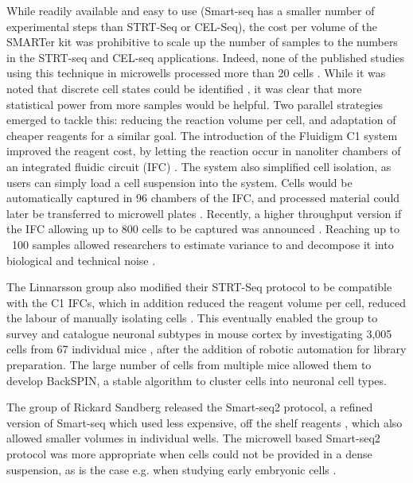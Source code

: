 While readily available and easy to use (Smart-seq has a smaller number of experimental
steps than STRT-Seq or CEL-Seq), the cost per volume of the SMARTer kit was prohibitive
to scale up the number of samples to the numbers in the STRT-seq and CEL-seq
applications. Indeed, none of the published studies using this technique in microwells
processed more than 20 cells \cite{Ramskold2012-zc, Marinov2014-bf, Shalek2013-lw}. While it was noted that discrete cell states could be identified \cite{Shalek2013-lw}, it was clear that more statistical power from more samples would be helpful. Two parallel strategies emerged to tackle this: reducing the reaction volume per cell, and adaptation of cheaper reagents for a similar goal. The introduction of the Fluidigm C1 system improved the reagent cost, by letting the reaction occur in nanoliter chambers of an integrated fluidic circuit (IFC) \cite{Fluidigm_Corporation2013-vw}. The system also simplified
cell isolation, as users can simply load a cell suspension into the system. Cells would be
automatically captured in 96 chambers of the IFC, and processed material could later be
transferred to microwell plates \cite{Wu2014-ot, Brennecke2013-vv}. Recently, a higher throughput version if the IFC allowing up to 800 cells to be captured was announced \cite{Fluidigm_Corporation2016-jl}. Reaching up to ~100 samples allowed researchers to estimate variance to and decompose it into biological and technical noise \cite{Brennecke2013-vv, Kim2015-mh}.

The Linnarsson group also modified their STRT-Seq protocol to be compatible with the C1
IFCs, which in addition reduced the reagent volume per cell, reduced the labour of manually
isolating cells \cite{Islam2014-dx}. This eventually enabled the group to survey and catalogue neuronal subtypes
in mouse cortex by investigating 3,005 cells from 67 individual mice \cite{Zeisel2015-mk}, after the addition of
robotic automation for library preparation. The large number of cells from multiple mice allowed them to develop BackSPIN, a stable algorithm to cluster cells into neuronal cell types.

The group of Rickard Sandberg released the Smart-seq2 protocol, a refined version of
Smart-seq which used less expensive, off the shelf reagents \cite{Picelli2013-px, Picelli2014-hr}, which also allowed smaller volumes in individual wells. The microwell based Smart-seq2 protocol was more appropriate when cells could not be provided in a dense suspension, as is the case e.g. when studying early embryonic cells \cite{Deng2014-ud}.

